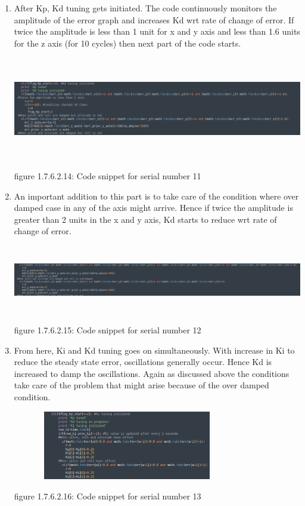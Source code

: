 \documentclass[a4paper,12pt,oneside]{book}
\begin{document}
\begin{enumerate}
\item After Kp, Kd tuning gets initiated. The code continuously monitors the amplitude of the error graph and increases Kd wrt rate of change of error. If twice the amplitude is less than 1 unit for x and y axis and less than 1.6 units for the z axis (for 10 cycles) then next part of the code starts. 


\includegraphics[width = 14cm , height= 4.5cm]{PID_err_8(4).png}
\begin{center}
    figure 1.7.6.2.14: Code snippet for serial number 11
\end{center}

\item An important addition to this part is to take care of the condition where over damped case in any of the axis might arrive.
Hence if twice the amplitude is greater than 2 units in the x and y axis, Kd starts to reduce wrt rate of change of error.

\includegraphics[width = 13.5cm , height= 3cm]{PID_err_8(5).png}
\begin{center}
    figure 1.7.6.2.15: Code snippet for serial number 12
\end{center}

\item From here, Ki and Kd tuning goes on simultaneously. With increase in Ki to reduce the steady state error, oscillations generally occur. Hence Kd is increased to damp the oscillations. Again as discussed above the conditions take care of the problem that might arise because of the over damped condition.

\includegraphics[width = 10cm , height= 3cm]{PID_err_8(6).png}
\begin{center}
    figure 1.7.6.2.16: Code snippet for serial number 13
\end{center}


\end{enumerate}
\end{document}
